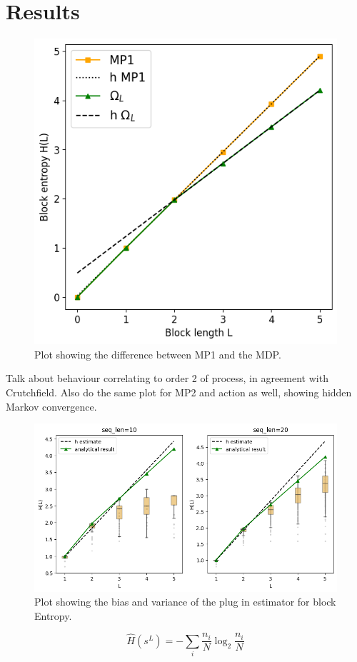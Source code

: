 \documentclass[12pt,a4paper]{article}
\begin{document}
\section{Results} \label{sec:results}

\begin{figure}[H]
    \centering
    \includegraphics[width=0.5\linewidth]{../figures/mp1_vs_obsL.png}
    \caption{\label{fig:mp1_vs_obsL} Plot showing the difference between MP1 and the MDP.}
\end{figure}

Talk about behaviour correlating to order 2 of process, in agreement with Crutchfield.
Also do the same plot for MP2 and action as well, showing hidden Markov convergence.

\newpage
\begin{figure}[H]
    \centering
    \includegraphics[width=1\linewidth]{../figures/block_entropy_estimation.png}
    \caption{\label{fig:entropy_est} Plot showing the bias and variance of the plug in estimator for block Entropy.}
\end{figure}

$$\hat{H}(s^L) = -\sum_i \frac{n_i}{N} \log_2{\frac{n_i}{N}}$$
\end{document}
